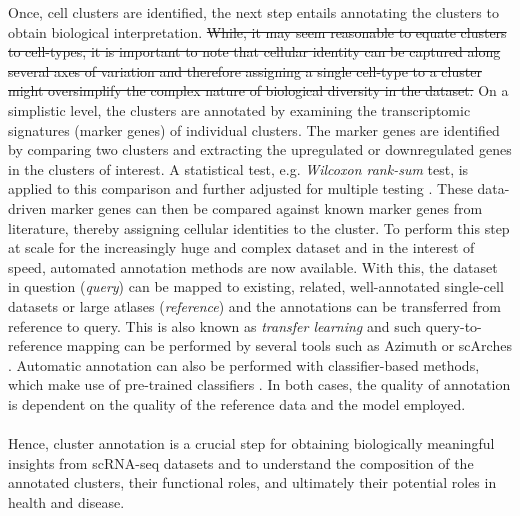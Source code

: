 Once, cell clusters are identified, the next step entails annotating the clusters to obtain biological interpretation. \st{While, it may seem reasonable to equate clusters to cell-types, it is important to note that cellular identity can be captured along several axes of variation and therefore assigning a single cell-type to a cluster might oversimplify the complex nature of biological diversity in the dataset.} On a simplistic level, the clusters are annotated by examining the transcriptomic signatures (marker genes) of individual clusters. The marker genes are identified by comparing two clusters and extracting the upregulated or downregulated genes in the clusters of interest. A statistical test, e.g. \textit{Wilcoxon rank-sum} test, is applied to this comparison and further adjusted for multiple testing %
. These data-driven marker genes can then be compared against known marker genes from literature, thereby assigning cellular identities to the cluster. To perform this step at scale for the increasingly huge and complex dataset and in the interest of speed, automated annotation methods are now available. With this, the dataset in question (\textit{query}) can be mapped to existing, related, well-annotated single-cell datasets or large atlases (\textit{reference}) and the annotations can be transferred from reference to query. This is also known as \textit{transfer learning} and such query-to-reference mapping can be performed by several tools such as Azimuth \textbf{\cite{hao_integrated_2021}} or scArches \textbf{\cite{lotfollahi_mapping_2021}}. Automatic annotation can also be performed with classifier-based methods, which make use of pre-trained classifiers \textbf{\cite{dominguez_conde_cross-tissue_2022,fu_clustifyr_2020}}. In both cases, the quality of annotation is dependent on the quality of the reference data and the model employed.\\\\
Hence, cluster annotation is a crucial step for obtaining biologically meaningful insights from scRNA-seq datasets and to understand the composition of the annotated clusters, their functional roles, and ultimately their potential roles in health and disease.


